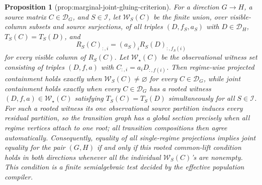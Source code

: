\documentclass{article}
\newtheorem{proposition}{Proposition}
\begin{document}
\begin{proposition}[prop:marginal-joint-gluing-criterion]\label{prop:marginal-joint-gluing-criterion}
For a direction \(G\to H\), a source matrix \(C\in\mathcal D_G\), and \(S\in\mathcal I\), let \(\mathcal W_S(C)\) be the finite union, over visible-column subsets and source surjections, of all triples \((D,f_S,a_S)\) with \(D\in\mathcal D_H\), \(T_S(C)=T_S(D)\), and
\[
R_S(C)_{:,i}=(a_S)_iR_S(D)_{:,f_S(i)}
\]
for every visible column of \(R_S(C)\). Let \(\mathcal W_\star(C)\) be the observational witness set consisting of triples \((D,f,a)\) with \(C_{:,i}=a_iD_{:,f(i)}\). Then regime-wise projected containment holds exactly when \(\mathcal W_S(C)\ne\varnothing\) for every \(C\in\mathcal D_G\), while joint containment holds exactly when every \(C\in\mathcal D_G\) has a rooted witness \((D,f,a)\in\mathcal W_\star(C)\) satisfying \(T_S(C)=T_S(D)\) simultaneously for all \(S\in\mathcal I\). For such a rooted witness its one observational source partition induces every residual partition, so the transition graph has a global section precisely when all regime vertices attach to one root; all transition compositions then agree automatically. Consequently, equality of all single-regime projections implies joint equality for the pair \((G,H)\) if and only if this rooted common-lift condition holds in both directions whenever all the individual \(\mathcal W_S(C)\)'s are nonempty. This condition is a finite semialgebraic test decided by the effective population compiler.
\end{proposition}
\end{document}
